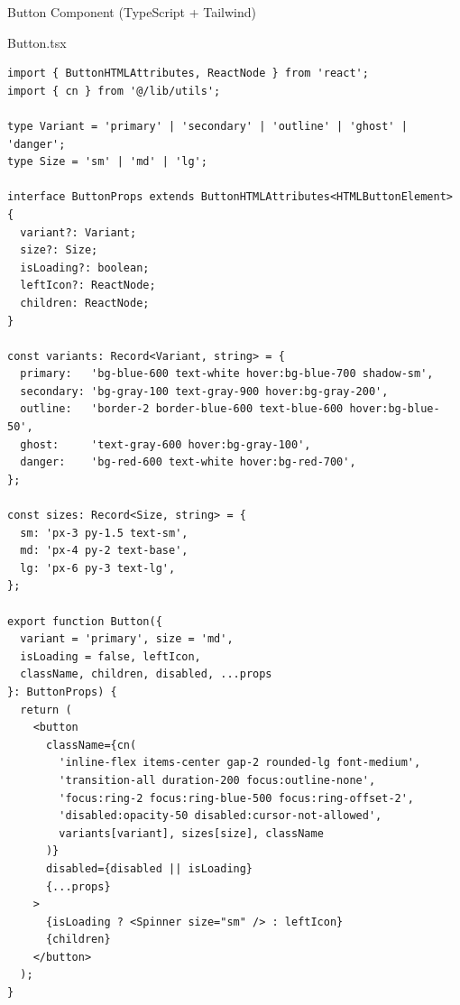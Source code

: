 \documentclass[12pt,a4paper]{article}
\begin{document}
\begin{compbox}{Button Component (TypeScript + Tailwind)}
\begin{codebox}{Button.tsx}
\begin{lstlisting}
import { ButtonHTMLAttributes, ReactNode } from 'react';
import { cn } from '@/lib/utils';

type Variant = 'primary' | 'secondary' | 'outline' | 'ghost' | 'danger';
type Size = 'sm' | 'md' | 'lg';

interface ButtonProps extends ButtonHTMLAttributes<HTMLButtonElement> {
  variant?: Variant;
  size?: Size;
  isLoading?: boolean;
  leftIcon?: ReactNode;
  children: ReactNode;
}

const variants: Record<Variant, string> = {
  primary:   'bg-blue-600 text-white hover:bg-blue-700 shadow-sm',
  secondary: 'bg-gray-100 text-gray-900 hover:bg-gray-200',
  outline:   'border-2 border-blue-600 text-blue-600 hover:bg-blue-50',
  ghost:     'text-gray-600 hover:bg-gray-100',
  danger:    'bg-red-600 text-white hover:bg-red-700',
};

const sizes: Record<Size, string> = {
  sm: 'px-3 py-1.5 text-sm',
  md: 'px-4 py-2 text-base',
  lg: 'px-6 py-3 text-lg',
};

export function Button({
  variant = 'primary', size = 'md',
  isLoading = false, leftIcon,
  className, children, disabled, ...props
}: ButtonProps) {
  return (
    <button
      className={cn(
        'inline-flex items-center gap-2 rounded-lg font-medium',
        'transition-all duration-200 focus:outline-none',
        'focus:ring-2 focus:ring-blue-500 focus:ring-offset-2',
        'disabled:opacity-50 disabled:cursor-not-allowed',
        variants[variant], sizes[size], className
      )}
      disabled={disabled || isLoading}
      {...props}
    >
      {isLoading ? <Spinner size="sm" /> : leftIcon}
      {children}
    </button>
  );
}
\end{lstlisting}
\end{codebox}
\end{compbox}

\vspace{0.5cm}
\end{document}
